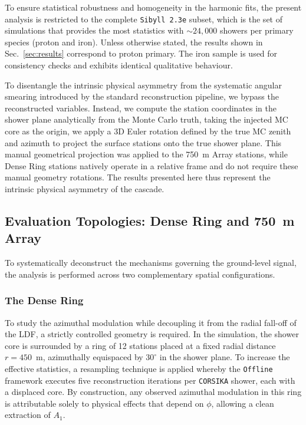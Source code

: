 \documentclass[11pt,a4paper]{article}
\begin{document}
To ensure statistical robustness and homogeneity in the harmonic fits, the present analysis is restricted to the complete \texttt{Sibyll\,2.3e} subset, which is the set of simulations that provides the most statistics with $\sim24,000$ showers per primary species (proton and iron). Unless otherwise stated, the results shown in Sec.~\ref{sec:results} correspond to proton primary. The iron sample is used for consistency checks and exhibits identical qualitative behaviour. 

To disentangle the intrinsic physical asymmetry from the systematic angular smearing introduced by the standard reconstruction pipeline, we bypass the reconstructed variables. Instead, we compute the station coordinates in the shower plane analytically from the Monte Carlo truth, taking the injected MC core as the origin, we apply a 3D Euler rotation defined by the true MC zenith and azimuth to project the surface stations onto the true shower plane. This manual geometrical projection was applied to the 750~m Array stations, while Dense Ring stations natively operate in a relative frame and do not require these manual geometry rotations. The results presented here thus represent the intrinsic physical asymmetry of the cascade.

\subsection{Evaluation Topologies: Dense Ring and 750~m Array}
\label{subsec:topologies}

To systematically deconstruct the mechanisms governing the ground-level signal, the analysis is performed across two complementary spatial configurations.

\subsubsection{The Dense Ring}
To study the azimuthal modulation while decoupling it from the radial fall-off of the LDF, a strictly controlled geometry is required. In the simulation, the shower core is surrounded by a ring of 12 stations placed at a fixed radial distance $r = 450$~m, azimuthally equispaced by $30^{\circ}$ in the shower plane. To increase the effective statistics, a resampling technique is applied whereby the \texttt{Offline} framework executes five reconstruction iterations per \texttt{CORSIKA} shower, each with a displaced core. By construction, any observed azimuthal modulation in this ring is attributable solely to physical effects that depend on $\phi$, allowing a clean extraction of $A_1$.
\end{document}
